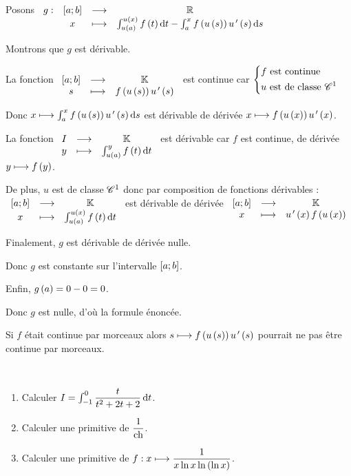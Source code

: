 \begin{dem}
Posons \(\fonction{g}{\intervii{a}{b}}{\R}{x}{\int_{u\paren{a}}^{u\paren{x}}f\paren{t}\odif{t}-\int_a^xf\paren{u\paren{s}}u\prim\paren{s}\odif{s}}\)

Montrons que \(g\) est dérivable.

La fonction \(\begin{array}[t]{ccc}\left[a;b\right] & \longrightarrow & \mathbb{K} \\ s & \longmapsto & f\left(u\left(s\right)\right)u^{\,\prime}\left(s\right)\end{array}\) est continue car \(\begin{dcases}f\text{ est continue} \\ u\text{ est de classe }\mathscr{C}^{1}\end{dcases}\)

Donc \(x\mapsto\int_a^xf\paren{u\paren{s}}u\prim\paren{s}\odif{s}\) est dérivable de dérivée \(x\longmapsto f\left(u\left(x\right)\right)u^{\,\prime}\left(x\right)\).

La fonction \(\fonctionlambda{I}{\K}{y}{\int_{u\paren{a}}^yf\paren{t}\odif{t}}\) est dérivable car \(f\) est continue, de dérivée \(y\longmapsto f\left(y\right)\).

De plus, \(u\) est de classe \(\mathscr{C}^{1}\) donc par composition de fonctions dérivables : \(\fonctionlambda{\intervii{a}{b}}{\K}{x}{\int_{u\paren{a}}^{u\paren{x}}f\paren{t}\odif{t}}\) est dérivable de dérivée \(\begin{array}[t]{ccc}\left[a;b\right] & \longrightarrow & \mathbb{K} \\ x & \longmapsto & u^{\,\prime}\left(x\right)f\left(u\left(x\right)\right)\end{array}\)

Finalement, \(g\) est dérivable de dérivée nulle.

Donc \(g\) est constante sur l'intervalle \(\left[a;b\right]\).

Enfin, \(g\left(a\right)=0-0=0\).

Donc \(g\) est nulle, d'où la formule énoncée.
\end{dem}

\begin{rem}
Si \(f\) était continue par morceaux alors \(s\longmapsto f\left(u\left(s\right)\right)u^{\,\prime}\left(s\right)\) pourrait ne pas être continue par morceaux.
\end{rem}

\begin{exoex}~\\
\begin{enumerate}
\item Calculer \(I=\int_{-1}^0\dfrac{t}{t^2+2t+2}\odif{t}\). \\

\item Calculer une primitive de \(\dfrac{1}{\operatorname{ch}}\). \\

\item Calculer une primitive de \(f:x\longmapsto\dfrac{1}{x\ln x\ln\left(\ln x\right)}\).
\end{enumerate}
\end{exoex}

